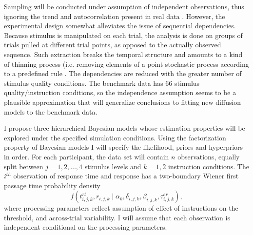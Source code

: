 \documentclass[12pt]{article}
\begin{document}
	Sampling will be conducted under assumption of independent observations, thus ignoring the trend and autocorrelation present in real data \citep{PerVan2002,CraPer2010}. However, the experimental design somewhat alleviates the issue of sequential dependencies. Because stimulus is manipulated on each trial, the analysis is done on groups of trials pulled at different trial points, as opposed to the actually observed sequence. Such extraction breaks the temporal structure and amounts to a kind of thinning process (i.e. removing elements of a point stochastic process according to a predefined rule \citep{RobCas2004,GamLop2006,GelCar2013,Ros2014}. The dependencies are reduced with the greater number of stimulus quality conditions. The benchmark data has 66 stimulus quality/instruction conditions, so the independence assumption seems to be a plausible approximation that will generalize conclusions to fitting new diffusion models to the benchmark data.
    
	I propose three hierarchical Bayesian models whose estimation properties will be explored under the specified simulation conditions. Using the factorization property of Bayesian models I will specify the likelihood, priors and hyperpriors in order. For each participant, the data set will contain $n$ observations, equally split between $j = 1, 2, \dots, 4$ stimulus levels and $k = 1, 2$ instruction conditions. The $i^{th}$ observation of response time and response has a two-boundary Wiener first passage time probability density
\begin{equation}
f(t_{i,j,k}^{rt}, r_{i,j,k} \mid \alpha_k, \delta_{i,j,k}, \beta_{i,j,k}, \tau_{i,j,k}^{er}),
\end{equation}
where processing parameters reflect assumption of effect of instructions on the threshold, and across-trial variability. I will assume that each observation is independent conditional on the processing parameters. 
\end{document}

